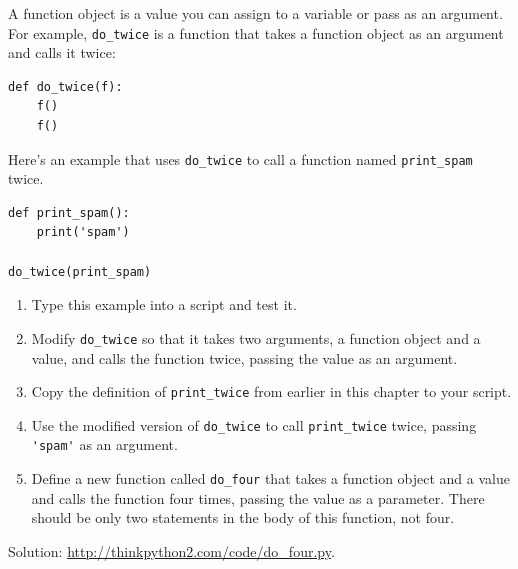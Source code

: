 \begin{exercise}

A function object is a value you can assign to a variable
or pass as an argument.  For example, \verb"do_twice" is a function
that takes a function object as an argument and calls it twice:

\begin{lstlisting}
def do_twice(f):
    f()
    f()
\end{lstlisting}

Here's an example that uses \verb"do_twice" to call a function
named \verb"print_spam" twice.

\begin{lstlisting}
def print_spam():
    print('spam')

do_twice(print_spam)
\end{lstlisting}

\begin{enumerate}

\item Type this example into a script and test it.

\item Modify \verb"do_twice" so that it takes two arguments, a
function object and a value, and calls the function twice,
passing the value as an argument.

\item Copy the definition of
\verb"print_twice" from earlier in this chapter to your script.

\item Use the modified version of \verb"do_twice" to call
\verb"print_twice" twice, passing \verb"'spam'" as an argument.

\item Define a new function called
\verb"do_four" that takes a function object and a value
and calls the function four times, passing the value
as a parameter.  There should be only
two statements in the body of this function, not four.

\end{enumerate}

Solution: \url{http://thinkpython2.com/code/do_four.py}.

\end{exercise}



